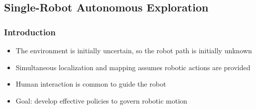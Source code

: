 \documentclass[11pt,professionalfonts,hyperref={pdftex,pdfpagemode=none,pdfstartview=FitH}]{beamer}
\begin{document}
\begin{frame}
\frametitle{}
{}
\end{frame}


\subsection*{Single-Robot Autonomous Exploration}

\begin{frame}
\frametitle{Introduction}
\begin{itemize}
        	\item The environment is initially uncertain, so the robot path is initially unknown
	\item Simultaneous localization and mapping assumes robotic actions are provided
	\item Human interaction is common to guide the robot
	\item Goal: develop effective policies to govern robotic motion 
\end{itemize}

\end{frame}
\end{document}

